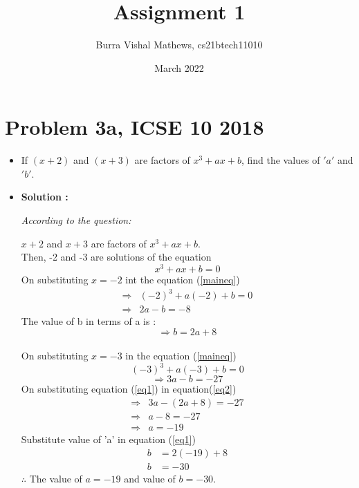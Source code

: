 \documentclass[journal,12pt,twocolumn]{IEEEtran}
\title{\textbf{Assignment 1}}
\author{Burra Vishal Mathews, cs21btech11010}
\date{March 2022}
\begin{document}
\maketitle

\section*{\textbf{Problem 3a, ICSE 10 2018}}
\begin{itemize}

\item If $(x+2)$ and $(x+3)$ are factors of $x^3+ax+b$, find the values of $'a'$ and $'b'$.\\

\item   \textbf{Solution :}
    
    \textit{According to the question:}

    $x+2$ and $x+3$ are factors of $x^3+ax+b$.\\
    Then, -2 and -3 are solutions of the equation \\
    \begin{equation}
    \label{maineq}
        x^3+ax+b=0
    \end{equation}
    On substituting $x=-2$  int the equation (\ref{maineq})
    \begin{align*}
        \Rightarrow & (-2)^3+a(-2)+b=0\\ 
        \Rightarrow & 2a-b=-8
    \end{align*}
    The value of b in terms of a is :
    \begin{equation}
    \label{eq1}
        \Rightarrow b=2a+8
    \end{equation}
    \\
    On substituting $x=-3$ in the equation (\ref{maineq})$$(-3)^3+a(-3)+b=0$$
     \begin{equation}
    \label{eq2}
       \Rightarrow 3a-b=-27
    \end{equation}
    On substituting equation (\ref{eq1}) in equation(\ref{eq2})
    \begin{align*}
        \Rightarrow & 3a-(2a+8)=-27\\
        \Rightarrow & a-8=-27\\
        \Rightarrow & a=-19
    \end{align*}
    Substitute value of 'a' in equation (\ref{eq1}) 
    \begin{align*}
    b&=2(-19)+8\\
    b&=-30
    \end{align*}
    $ \therefore $ The value of $a = -19$ and value of $b = -30$.\\
    

\end{itemize}
\end{document}
